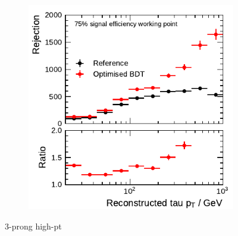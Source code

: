 \begin{figure}[htb]
\begin{subfigure}{0.48\textwidth}
  \end{subfigure}
  \begin{subfigure}{0.48\textwidth}
    \centering
    \includegraphics{./figures/bdt_perf/post_optimisation/3p_highpt/rejection_loose_ratio_highpt.pdf}
  \end{subfigure}
  \caption{3-prong high-pt}
\end{figure}


\clearpage
